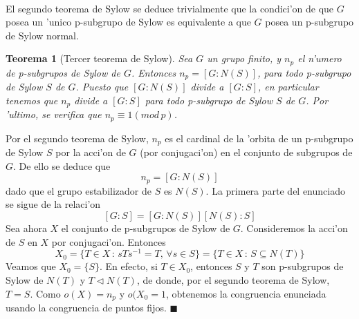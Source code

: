 \documentclass[a4paper,openright,12pt]{report}
\numberwithin{equation}{section} %
\newtheorem{teorema}{Teorema}[section] %
\newenvironment{proof}{\noindent{\it Demostracion:}}{\hfill$\blacksquare$} %
\begin{document}
\\
El segundo teorema de Sylow se deduce trivialmente que la condici'on de que $G$ posea un 'unico p-subgrupo de Sylow es equivalente a que $G$ posea un p-subgrupo de Sylow normal.
\begin{teorema}[Tercer teorema de Sylow]
Sea $G$ un grupo finito, y $n_{p}$ el n'umero de p-subgrupos de Sylow de $G$. Entonces $n_{p}=[G:N(S)]$, para todo p-subgrupo de Sylow $S$ de $G$. Puesto que $[G:N(S)]$ divide a $[G:S]$, en particular tenemos que $n_{p}$ divide a $[G:S]$ para todo p-subgrupo de Sylow $S$ de $G$. Por 'ultimo, se verifica que $n_{p} \equiv 1(mod \, p)$.
\end{teorema}
\begin{proof}
Por el segundo teorema de Sylow, $n_{p}$ es el cardinal de la 'orbita de un p-subgrupo de Sylow $S$ por la acci'on de $G$ (por conjugaci'on) en el conjunto de subgrupos de $G$. De ello se deduce que
\[
n_{p}=[G:N(S)]
\]
dado que el grupo estabilizador de $S$ es $N(S)$. La primera parte del enunciado se sigue de la relaci'on
\[
[G:S]=[G:N(S)][N(S):S]
\]
Sea ahora $X$ el conjunto de p-subgrupos de Sylow de $G$. Consideremos la acci'on de $S$ en $X$ por conjugaci'on. Entonces
\[
X_{0}=\{ T \in X \, : \, sTs^{-1}=T, \, \forall s \in S \} = \{T \in X \, : \, S \subseteq N(T) \}
\]
Veamos que $X_{0}=\{ S \}$. En efecto, si $T \in X_{0}$, entonces $S$ y $T$ son p-subgrupos de Sylow de $N(T)$ y $T \triangleleft N(T)$, de donde, por el segundo teorema de Sylow, $T=S$. Como $o(X)=n_{p}$ y $o(X_{0}=1$, obtenemos la congruencia enunciada usando la congruencia de puntos fijos.
\end{proof}
\end{document}
